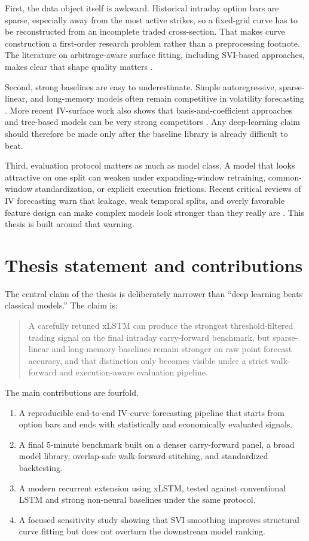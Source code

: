 \documentclass[12pt]{report}
\begin{document}
First, the data object itself is awkward. Historical intraday option bars are sparse, especially away from the most active strikes, so a fixed-grid curve has to be reconstructed from an incomplete traded cross-section. That makes curve construction a first-order research problem rather than a preprocessing footnote. The literature on arbitrage-aware surface fitting, including SVI-based approaches, makes clear that shape quality matters \citep{gatheral2014arbitrage}.

Second, strong baselines are easy to underestimate. Simple autoregressive, sparse-linear, and long-memory models often remain competitive in volatility forecasting \citep{engle1982,bollerslev1986,corsi2009}. More recent IV-surface work also shows that basis-and-coefficient approaches and tree-based models can be very strong competitors \citep{chen2024bspline}. Any deep-learning claim should therefore be made only after the baseline library is already difficult to beat.

Third, evaluation protocol matters as much as model class. A model that looks attractive on one split can weaken under expanding-window retraining, common-window standardization, or explicit execution frictions. Recent critical reviews of IV forecasting warn that leakage, weak temporal splits, and overly favorable feature design can make complex models look stronger than they really are \citep{arratia2025}. This thesis is built around that warning.

\section{Thesis statement and contributions}
The central claim of the thesis is deliberately narrower than ``deep learning beats classical models.'' The claim is:

\begin{quote}
A carefully retuned xLSTM can produce the strongest threshold-filtered trading signal on the final intraday carry-forward benchmark, but sparse-linear and long-memory baselines remain stronger on raw point forecast accuracy, and that distinction only becomes visible under a strict walk-forward and execution-aware evaluation pipeline.
\end{quote}

The main contributions are fourfold.
\begin{enumerate}[leftmargin=1.3cm]
    \item A reproducible end-to-end IV-curve forecasting pipeline that starts from option bars and ends with statistically and economically evaluated signals.
    \item A final 5-minute benchmark built on a denser carry-forward panel, a broad model library, overlap-safe walk-forward stitching, and standardized backtesting.
    \item A modern recurrent extension using xLSTM, tested against conventional LSTM and strong non-neural baselines under the same protocol.
    \item A focused sensitivity study showing that SVI smoothing improves structural curve fitting but does not overturn the downstream model ranking.
\end{enumerate}
\end{document}
